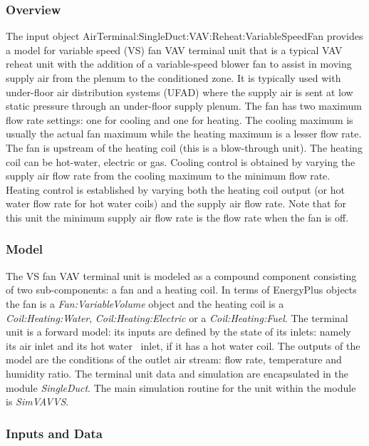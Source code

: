 \subsubsection{Overview}\label{overview-2-000}

The input object AirTerminal:SingleDuct:VAV:Reheat:VariableSpeedFan provides a model for variable speed (VS) fan VAV terminal unit that is a typical VAV reheat unit with the addition of a variable-speed blower fan to assist in moving supply air from the plenum to the conditioned zone. It is typically used with under-floor air distribution systems (UFAD) where the supply air is sent at low static pressure through an under-floor supply plenum. The fan has two maximum flow rate settings: one for cooling and one for heating. The cooling maximum is usually the actual fan maximum while the heating maximum is a lesser flow rate. The fan is upstream of the heating coil (this is a blow-through unit). The heating coil can be hot-water, electric or gas. Cooling control is obtained by varying the supply air flow rate from the cooling maximum to the minimum flow rate. Heating control is established by varying both the heating coil output (or hot water flow rate for hot water coils) and the supply air flow rate. Note that for this unit the minimum supply air flow rate is the flow rate when the fan is off.

\subsubsection{Model}\label{model-2}

The VS fan VAV terminal unit is modeled as a compound component consisting of two sub-components: a fan and a heating coil. In terms of EnergyPlus objects the fan is a \emph{Fan:VariableVolume} object and the heating coil is a \emph{Coil:Heating:Water}, \emph{Coil:Heating:Electric} or a \emph{Coil:Heating:Fuel}. The terminal unit is a forward model: its inputs are defined by the state of its inlets: namely its air inlet and its hot water~ inlet, if it has a hot water coil. The outputs of the model are the conditions of the outlet air stream: flow rate, temperature and humidity ratio. The terminal unit data and simulation are encapsulated in the module \emph{SingleDuct}. The main simulation routine for the unit within the module is \emph{SimVAVVS}.

\subsubsection{Inputs and Data}\label{inputs-and-data-2}

